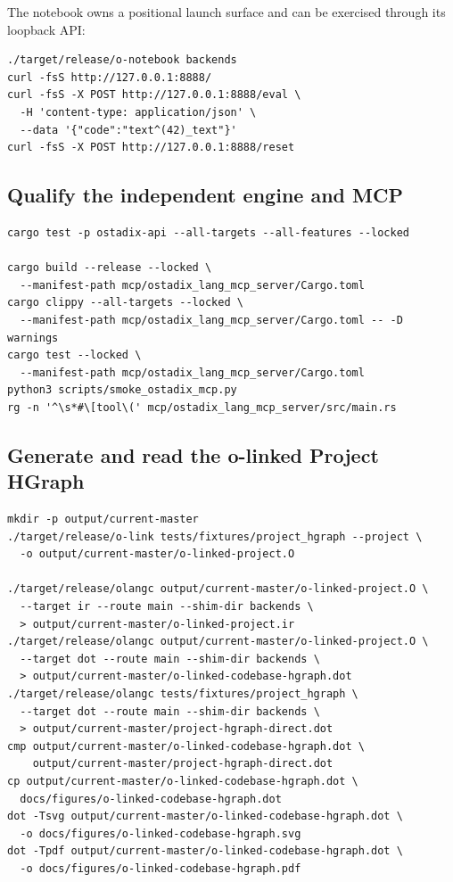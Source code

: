 \documentclass[11pt,oneside]{article}
\begin{document}
The notebook owns a positional launch surface and can be exercised through its
loopback API:

\begin{lstlisting}[style=plaincode]
./target/release/o-notebook backends
curl -fsS http://127.0.0.1:8888/
curl -fsS -X POST http://127.0.0.1:8888/eval \
  -H 'content-type: application/json' \
  --data '{"code":"text^(42)_text"}'
curl -fsS -X POST http://127.0.0.1:8888/reset
\end{lstlisting}

\subsection{Qualify the independent engine and MCP}

\begin{lstlisting}[style=plaincode]
cargo test -p ostadix-api --all-targets --all-features --locked

cargo build --release --locked \
  --manifest-path mcp/ostadix_lang_mcp_server/Cargo.toml
cargo clippy --all-targets --locked \
  --manifest-path mcp/ostadix_lang_mcp_server/Cargo.toml -- -D warnings
cargo test --locked \
  --manifest-path mcp/ostadix_lang_mcp_server/Cargo.toml
python3 scripts/smoke_ostadix_mcp.py
rg -n '^\s*#\[tool\(' mcp/ostadix_lang_mcp_server/src/main.rs
\end{lstlisting}

\subsection{Generate and read the o-linked Project HGraph}

\begin{lstlisting}[style=plaincode]
mkdir -p output/current-master
./target/release/o-link tests/fixtures/project_hgraph --project \
  -o output/current-master/o-linked-project.O

./target/release/olangc output/current-master/o-linked-project.O \
  --target ir --route main --shim-dir backends \
  > output/current-master/o-linked-project.ir
./target/release/olangc output/current-master/o-linked-project.O \
  --target dot --route main --shim-dir backends \
  > output/current-master/o-linked-codebase-hgraph.dot
./target/release/olangc tests/fixtures/project_hgraph \
  --target dot --route main --shim-dir backends \
  > output/current-master/project-hgraph-direct.dot
cmp output/current-master/o-linked-codebase-hgraph.dot \
    output/current-master/project-hgraph-direct.dot
cp output/current-master/o-linked-codebase-hgraph.dot \
  docs/figures/o-linked-codebase-hgraph.dot
dot -Tsvg output/current-master/o-linked-codebase-hgraph.dot \
  -o docs/figures/o-linked-codebase-hgraph.svg
dot -Tpdf output/current-master/o-linked-codebase-hgraph.dot \
  -o docs/figures/o-linked-codebase-hgraph.pdf
\end{lstlisting}
\end{document}
